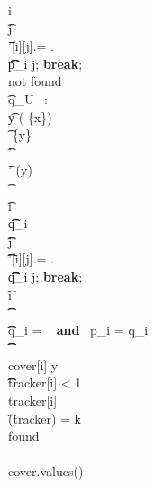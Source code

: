 \begin{figure*}[ht!]
\begin{pchstack}[boxed,center,space=0.5em]
{%
			\pcfor i \in [k] \\
			\t \pcfor  j \in [m]\\
			\t \t \pcif \repr'[i][j].\fp \not= \repr[i][j].\fp\\
			\t \t \t  p_i \gets j; \textbf{break};\\
			\hspace{-.5em}
			\pcwhile \textrm{not found}\\
			\t \pcif q_U \ \UPO{}:\pcreturn \emptyset\\
			\t y \getsr {}\setminus ( \cup \{x\})\\
			\t \set{I} \gets {} \cup \{y\}\\
			\t  \repr \gets \repr'\\
			\t \repr' \gets \UPO(y) \\
			\t {}\\
			\t \pcfor i \in [k] \\
			\t \t q_i \gets {}\\
			\t \t \pcfor  j \in [m]\\
			\t \t \t \pcif \repr'[i][j].\fp \not= \repr[i][j].\fp\\
			\t \t \t  \t q_i \gets j; \textbf{break};\\
			\t \pcfor i \in [k]\\
			\t \t {}\\
			\t \t \pcif q_i \not=  \ \textbf{ and } \ p_i = q_i\\
			\t \t \t {}\\
			\t \t \t \textrm{cover}[i] \gets y\\
			\t \t \t \pcif \textrm{tracker}[i] < 1\\
			\t \t \t \t  \textrm{tracker}[i] \\
			\t \pcif {}(\textrm{tracker}) = k\\
			\t \t \textrm{found} \gets {}\\
			\\
			\pcreturn \textrm{cover.values()} \  
		}
	\end{pchstack}

\end{figure*}
